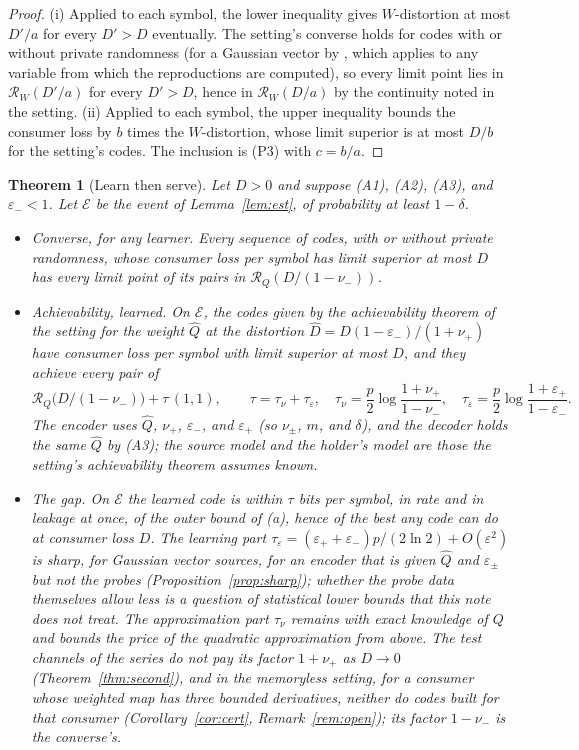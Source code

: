 \documentclass[11pt,onecolumn]{IEEEtran}
\newtheorem{theorem}{Theorem}
\newcommand{\cR}{\mathcal R}
\newcommand{\nup}{\nu_{+}}
\newcommand{\num}{\nu_{-}}
\newcommand{\epp}{\varepsilon_{+}}
\newcommand{\emm}{\varepsilon_{-}}
\begin{document}
\begin{proof}
(i) Applied to each symbol, the lower inequality gives $W$-distortion at most $D'/a$
for every $D'>D$ eventually. The setting's converse holds for codes with or without
private randomness \cite[Sec.~II]{part4} (for a Gaussian vector by
\cite[Proposition~2]{part1}, which applies to any variable from which the
reproductions are computed), so every limit point lies in $\cR_W(D'/a)$ for every
$D'>D$, hence in $\cR_W(D/a)$ by the continuity noted in the setting.
(ii) Applied to each symbol, the upper inequality bounds the consumer loss by $b$
times the $W$-distortion, whose limit superior is at most $D/b$ for the setting's
codes. The inclusion is (P3) with $c=b/a$.
\end{proof}

\begin{theorem}[Learn then serve]\label{thm:T1}
Let $D>0$ and suppose (A1), (A2), (A3), and $\emm<1$. Let $\mathcal E$ be the event of
Lemma~\ref{lem:est}, of probability at least $1-\delta$.
\begin{itemize}
\item[(a)] \emph{Converse, for any learner.} Every sequence of codes, with or without
private randomness, whose consumer loss per symbol has limit superior at most $D$ has
every limit point of its pairs in $\cR_Q(D/(1-\num))$.
\item[(b)] \emph{Achievability, learned.} On $\mathcal E$, the codes given by the
achievability theorem of the setting for the weight $\hat Q$ at the distortion
$\hat D=D(1-\emm)/(1+\nup)$ have consumer loss per symbol with limit superior at most
$D$, and they achieve every pair of
\[
\cR_Q\bigl(D/(1-\num)\bigr)+\tau\,(1,1),\qquad
\tau=\tau_\nu+\tau_\varepsilon,\quad
\tau_\nu=\frac p2\log\frac{1+\nup}{1-\num},\quad
\tau_\varepsilon=\frac p2\log\frac{1+\epp}{1-\emm}.
\]
The encoder uses $\hat Q$, $\nup$, $\emm$, and $\epp$ (so $\nu_\pm$, $m$, and $\delta$),
and the decoder holds the same $\hat Q$ by (A3); the source model and the holder's model
are those the setting's achievability theorem assumes known.
\item[(c)] \emph{The gap.} On $\mathcal E$ the learned code is within $\tau$ bits per
symbol, in rate and in leakage at once, of the outer bound of (a), hence of the best
any code can do at consumer loss $D$. The learning part
$\tau_\varepsilon=(\epp+\emm)p/(2\ln2)+O(\varepsilon^2)$ is sharp, for Gaussian vector
sources, for an encoder that is given $\hat Q$ and $\varepsilon_\pm$ but not the probes
(Proposition~\ref{prop:sharp}); whether the probe data themselves allow less is a
question of statistical lower bounds that this note does not treat. The approximation
part $\tau_\nu$ remains with exact knowledge of $Q$ and bounds the price of the
quadratic approximation from above. The test channels of the series do not pay its
factor $1+\nup$ as $D\to0$ (Theorem~\ref{thm:second}), and in the memoryless setting,
for a consumer whose weighted map has three bounded derivatives, neither do codes built
for that consumer (Corollary~\ref{cor:cert}, Remark~\ref{rem:open}); its factor
$1-\num$ is the converse's.
\end{itemize}
\end{theorem}
\end{document}
